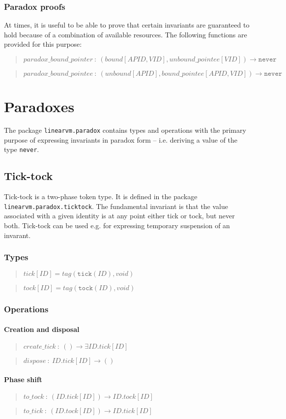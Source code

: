 \documentclass[a4paper]{book}
\newcommand\TypeDefinition[1]{\begin{quote}$\mathit{#1}$\end{quote}}
\newcommand\FuncSignature[2]{\begin{quote}$\mathit{#1}\ :\ \mathit{#2}$\end{quote}}
\begin{document}
\subsection*{Paradox proofs}

At times, it is useful to be able to prove that certain invariants are
guaranteed to hold because of a combination of available resources.
The following functions are provided for this purpose:

\FuncSignature{paradox\_bound\_pointer}{
  (bound[APID,VID], unbound\_pointee[VID]) \to \mathtt{never}}
\FuncSignature{paradox\_bound\_pointee}{
  (unbound[APID], bound\_pointee[APID,VID]) \to \mathtt{never}}

\chapter{Paradoxes}
The package \texttt{linearvm.paradox} contains types and operations
with the primary purpose of expressing invariants in paradox form --
i.e. deriving a value of the type \texttt{never}.

\section{Tick-tock}
Tick-tock is a two-phase token type.
It is defined in the package \texttt{linearvm.paradox.ticktock}.
The fundamental invariant is that the value associated with a given identity
is at any point either tick or tock, but never both.
Tick-tock can be used e.g. for expressing temporary suspension of an invarant.

\subsection*{Types}
\TypeDefinition{tick[ID] = tag(\texttt{tick}(ID), void)}
\TypeDefinition{tock[ID] = tag(\texttt{tock}(ID), void)}

\subsection*{Operations}
\subsubsection*{Creation and disposal}
\FuncSignature{create\_tick}{() \to \exists ID.tick[ID]}
\FuncSignature{dispose}{ID.tick[ID] \to ()}

\subsubsection*{Phase shift}
\FuncSignature{to\_tock}{(ID.tick[ID]) \to ID.tock[ID]}
\FuncSignature{to\_tick}{(ID.tock[ID]) \to ID.tick[ID]}
\end{document}

